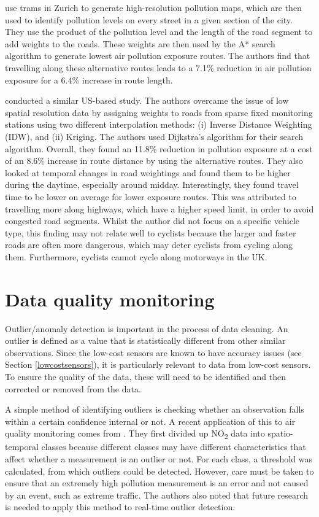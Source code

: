 \documentclass[11pt]{report}
\begin{document}
\cite{Hasenfratz2015highresmapsTram} use trams in Zurich to generate high-resolution pollution maps, which are then used to identify pollution levels on every street in a given section of the city. They use the product of the pollution level and the length of the road segment to add weights to the roads. These weights are then used by the A* search algorithm to generate lowest air pollution exposure routes. The authors find that travelling along these alternative routes leads to a 7.1\% reduction in air pollution exposure for a 6.4\% increase in route length.

\cite{sharker2014exposureroutes} conducted a similar US-based study. The authors overcame the issue of low spatial resolution data by assigning weights to roads from sparse fixed monitoring stations using two different interpolation methods: (i) Inverse Distance Weighting (IDW), and (ii) Kriging. The authors used Dijkstra's algorithm for their search algorithm. Overall, they found an 11.8\% reduction in pollution exposure at a cost of an 8.6\% increase in route distance by using the alternative routes. They also looked at temporal changes in road weightings and found them to be higher during the daytime, especially around midday. Interestingly, they found travel time to be lower on average for lower exposure routes. This was attributed to travelling more along highways, which have a higher speed limit, in order to avoid congested road segments. Whilst the author did not focus on a specific vehicle type, this finding may not relate well to cyclists because the larger and faster roads are often more dangerous, which may deter cyclists from cycling along them. Furthermore, cyclists cannot cycle along motorways in the UK. 

\section{Data quality monitoring}

Outlier/anomaly detection is important in the process of data cleaning. An outlier is defined as a value that is statistically different from other similar observations. Since the low-cost sensors are known to have accuracy issues (see Section \ref{lowcostsensors}), it is particularly relevant to data from low-cost sensors. To ensure the quality of the data, these will need to be identified and then corrected or removed from the data.

A simple method of identifying outliers is checking whether an observation falls within a certain confidence internal or not. A recent application of this to air quality monitoring comes from \cite{vanZoest2018outlierdetection}. They first divided up NO\textsubscript{2} data into spatio-temporal classes because different classes may have different characteristics that affect whether a measurement is an outlier or not. For each class, a threshold was calculated, from which outliers could be detected.  However, care must be taken to ensure that an extremely high pollution measurement is an error and not caused by an event, such as extreme traffic. The authors also noted that future research is needed to apply this method to real-time outlier detection.
\end{document}
